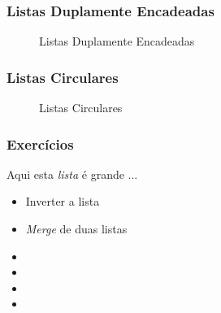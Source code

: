 


\begin{frame}%

\frametitle{Listas Duplamente Encadeadas}

\begin{figure}[!hb]
	\centering
			\caption{Listas Duplamente Encadeadas}	
		\end{figure} 

\end{frame} 


\begin{frame}%

\frametitle{Listas Circulares}

\begin{figure}[!hb]
	\centering
			\caption{Listas Circulares}	
		\end{figure} 

\end{frame} 


\begin{frame}%

\frametitle{Exercícios}

\begin{block}{Aqui esta \textit{lista} é grande ... }

\begin{itemize}
  \item Inverter a lista
  \item \textit{Merge} de duas listas
  \item 
  \item 
  \item 
  \item 
  
  
  
\end{itemize}


\end{block}


\end{frame} 

